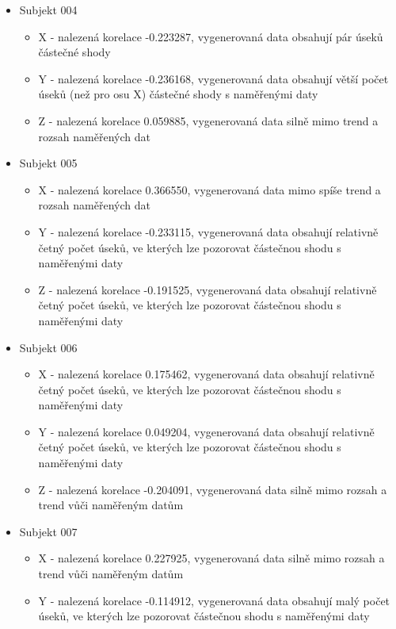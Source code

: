 \documentclass[12pt, a4paper]{article}
\begin{document}
\begin{itemize}
\begin{itemize}
      \end{itemize}
  \item Subjekt 004 
      \begin{itemize}
        \item X - nalezená korelace -0.223287, vygenerovaná data obsahují pár úseků částečné shody
        \item Y - nalezená korelace -0.236168, vygenerovaná data obsahují větší počet úseků (než pro osu X) částečné shody s naměřenými daty 
        \item Z - nalezená korelace 0.059885, vygenerovaná data silně mimo trend a rozsah naměřených dat 
      \end{itemize}
  \item Subjekt 005 
      \begin{itemize}
        \item X - nalezená korelace 0.366550, vygenerovaná data mimo spíše trend a rozsah naměřených dat 
        \item Y - nalezená korelace -0.233115, vygenerovaná data obsahují relativně četný počet úseků, ve kterých lze pozorovat částečnou shodu s naměřenými daty  
        \item Z - nalezená korelace -0.191525, vygenerovaná data obsahují relativně četný počet úseků, ve kterých lze pozorovat částečnou shodu s naměřenými daty  
      \end{itemize}
  \item Subjekt 006 
      \begin{itemize}
        \item X - nalezená korelace 0.175462, vygenerovaná data obsahují relativně četný počet úseků, ve kterých lze pozorovat částečnou shodu s naměřenými daty  
        \item Y - nalezená korelace 0.049204, vygenerovaná data obsahují relativně četný počet úseků, ve kterých lze pozorovat částečnou shodu s naměřenými daty  
        \item Z - nalezená korelace -0.204091, vygenerovaná data silně mimo rozsah a trend vůči naměřeným datům
      \end{itemize}
  \item Subjekt 007 
      \begin{itemize}
        \item X - nalezená korelace 0.227925, vygenerovaná data silně mimo rozsah a trend vůči naměřeným datům
        \item Y - nalezená korelace -0.114912, vygenerovaná data obsahují malý počet úseků, ve kterých lze pozorovat částečnou shodu s naměřenými daty 

\end{itemize}
\end{itemize}
\end{document}

